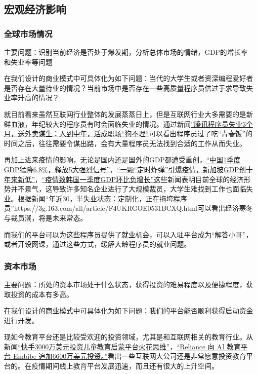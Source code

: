 \documentclass[a4paper]{ctexart}
\begin{document}
\subsection{宏观经济影响}
\subsubsection{全球市场情况}
主要问题：识别当前经济是否处于爆发期，分析总体市场的情绪，GDP的增长率和失业率等问题

在我们设计的商业模式中可具体化为如下问题：当代的大学生或者资深编程爱好者是否存在大量待业的情况？当前市场中是否存在一些高质量程序员供过于求导致失业率升高的情况？

就目前看来虽然互联网行业整体的发展蒸蒸日上，但是互联网行业大多需要的是新鲜血液，年纪较大的程序员有时会面临失业的情况。通过新闻\href{https://baijiahao.baidu.com/s?id=1650890199865475535&wfr=spider&for=pc}{”腾讯程序员失业3个月，送外卖谋生：人到中年，活成职场“狗不理“}可以看出程序员过了吃“青春饭”的时间之后，往往需要令谋出路，会有大量程序员无法找到合适的工作从而失业。

再加上进来疫情的影响，无论是国内还是国外的GDP都遭受重创，\href{https://3g.163.com/war/article_cambrian/FAKJHGDM0515DN7K.html}{“中国1季度GDP猛降6.8\%，释放5大强烈信号”}，\href{http://news.ifeng.com/c/7vvZCnm9p9K}{“一颗“定时炸弹”引爆疫情，新加坡GDP创十年来新低”}，\href{https://baijiahao.baidu.com/s?id=1664737589784546565&wfr=spider&for=pc}{“疫情致韩国一季度GDP环比负增长”}这些新闻表明目前全球的经济形势并不景气，这导致许多知名企业进行了大规模裁员，大学生难找到工作也面临失业。根据新闻“年近30，半失业状态：定制化，正在拖垮程序员”https://3g.163.com/all/article/F4UKRGOE0531BCXQ.html可以看出经济寒冬与裁员潮，将是未来常态。

而我们的平台可以为这些程序员提供了就业机会，可以入驻平台成为“解答小哥”，或者开设网课，通过这些方式，缓解大龄程序员的就业问题。

\subsubsection{资本市场}
主要问题：所处的资本市场处于什么状态，获得投资的难易程度以及便捷程度，获取投资的成本有多高。

在我们设计的商业模式中可具体化为如下问题：我们的平台能否顺利获得启动资金进行开发。

现如今教育平台还是比较受欢迎的投资领域，尤其是和互联网相关的教育行业。从新闻\href{https://baijiahao.baidu.com/s?id=1664547183775159480&wfr=spider&for=pc}{“快手3000万美元投资儿童教育启蒙平台火花思维”}，\href{https://36kr.com/p/5310719}{“Reliance 向 AI 教育平台 Embibe 追加6600万美元投资。”}看出一些互联网大公司还是非常愿意投资教育平台的。在疫情期间线上教育平台发展迅速，而且还有很大的上升空间。
\end{document}

